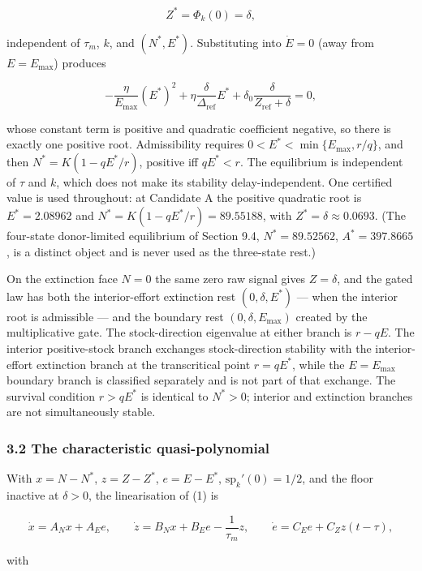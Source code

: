 \documentclass[11pt]{article}
\begin{document}
\[Z^* = \Phi_k(0) = \delta,\]

independent of \(\tau_m\), \(k\), and \((N^*, E^*)\). Substituting into
\(\dot E = 0\) (away from \(E = E_{\max}\)) produces

\[-\frac{\eta}{E_{\max}}(E^*)^2 + \eta\frac{\delta}{\Delta_{\mathrm{ref}}}E^* + \delta_0\frac{\delta}{Z_{\mathrm{ref}} + \delta} = 0,\]

whose constant term is positive and quadratic coefficient negative, so
there is exactly one positive root. Admissibility requires
\(0 < E^* < \min\{E_{\max}, r/q\}\), and then \(N^* = K(1 - qE^*/r)\),
positive iff \(qE^* < r\). The equilibrium is independent of \(\tau\)
and \(k\), which does not make its stability delay-independent. One
certified value is used throughout: at Candidate A the positive
quadratic root is \(E^* = 2.08962\) and
\(N^* = K(1 - qE^*/r) = 89.55188\), with
\(Z^* = \delta \approx 0.0693\). (The four-state donor-limited
equilibrium of Section 9.4, \(N^* = 89.52562\), \(A^* = 397.8665\), is a
distinct object and is never used as the three-state rest.)

On the extinction face \(N = 0\) the same zero raw signal gives
\(Z = \delta\), and the gated law has both the interior-effort
extinction rest \((0, \delta, E^*)\) --- when the interior root is
admissible --- and the boundary rest \((0, \delta, E_{\max})\) created
by the multiplicative gate. The stock-direction eigenvalue at either
branch is \(r - qE\). The interior positive-stock branch exchanges
stock-direction stability with the interior-effort extinction branch at
the transcritical point \(r = qE^*\), while the \(E = E_{\max}\)
boundary branch is classified separately and is not part of that
exchange. The survival condition \(r > qE^*\) is identical to
\(N^* > 0\); interior and extinction branches are not simultaneously
stable.

\subsubsection{3.2 The characteristic
quasi-polynomial}\label{the-characteristic-quasi-polynomial}

With \(x = N - N^*\), \(z = Z - Z^*\), \(e = E - E^*\),
\(\mathrm{sp}_k'(0) = 1/2\), and the floor inactive at \(\delta > 0\),
the linearisation of (1) is

\[\dot x = A_N x + A_E e, \qquad \dot z = B_N x + B_E e - \frac{1}{\tau_m}z, \qquad \dot e = C_E e + C_Z z(t - \tau),\]

with
\end{document}
